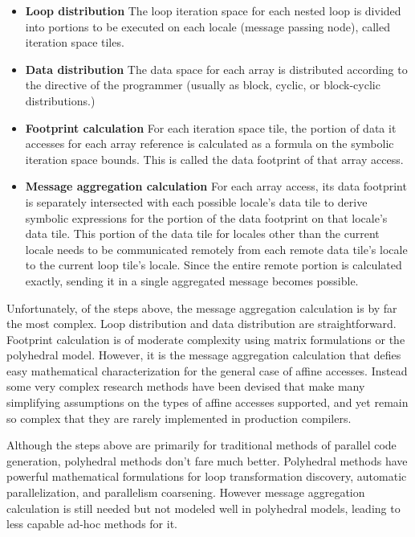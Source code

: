 \begin{itemize}

\item {\bf Loop distribution} The loop iteration space for each nested loop is divided into portions to be executed on each locale (message passing node), called iteration space tiles. 

\item {\bf Data distribution} The data space for each array is distributed according to the directive of the programmer (usually as block, cyclic, or block-cyclic distributions.)

\item {\bf Footprint calculation} For each iteration space tile, the portion of data it accesses for each array reference is calculated as a formula on the symbolic iteration space bounds. This is called the data footprint of that array access.

\item {\bf Message aggregation calculation} For each array access, its data footprint is separately intersected with each possible locale's data tile to derive symbolic expressions for the portion of the data footprint on that locale's data tile. This portion of the data tile for locales other than the current locale needs to be communicated remotely from each remote data tile's locale to the current loop tile's locale. Since the entire remote portion is calculated exactly, sending it in a single aggregated message becomes possible.

\end{itemize}

Unfortunately, of the steps above, the message aggregation calculation is by far the most complex. Loop distribution and data distribution are straightforward. Footprint calculation is of moderate complexity using matrix formulations or the polyhedral model. However, it is the message aggregation calculation that defies easy mathematical characterization for the general case of affine accesses. Instead some very complex research methods \cite{goumas2006message, xue1997communication} have been devised that make many simplifying assumptions on the types of affine accesses supported, and yet remain so complex that they are rarely implemented in production compilers.

Although the steps above are primarily for traditional methods of parallel code generation, polyhedral methods don't fare much better. Polyhedral methods have powerful mathematical formulations for loop transformation discovery, automatic parallelization, and parallelism coarsening. However message aggregation calculation is still needed but not modeled well in polyhedral models, leading to less capable ad-hoc methods for it.

